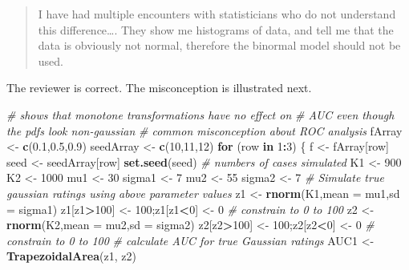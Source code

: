 \documentclass[
]{book}
\newenvironment{Shaded}{\begin{snugshade}}{\end{snugshade}}
\newcommand{\CommentTok}[1]{\textcolor[rgb]{0.56,0.35,0.01}{\textit{#1}}}
\newcommand{\ControlFlowTok}[1]{\textcolor[rgb]{0.13,0.29,0.53}{\textbf{#1}}}
\newcommand{\DataTypeTok}[1]{\textcolor[rgb]{0.13,0.29,0.53}{#1}}
\newcommand{\DecValTok}[1]{\textcolor[rgb]{0.00,0.00,0.81}{#1}}
\newcommand{\FloatTok}[1]{\textcolor[rgb]{0.00,0.00,0.81}{#1}}
\newcommand{\KeywordTok}[1]{\textcolor[rgb]{0.13,0.29,0.53}{\textbf{#1}}}
\newcommand{\NormalTok}[1]{#1}
\newcommand{\OperatorTok}[1]{\textcolor[rgb]{0.81,0.36,0.00}{\textbf{#1}}}
\newcommand{\StringTok}[1]{\textcolor[rgb]{0.31,0.60,0.02}{#1}}
\begin{document}
\begin{quote}
I have had multiple encounters with statisticians who do not understand this difference\ldots. They show me histograms of data, and tell me that the data is obviously not normal, therefore the binormal model should not be used.
\end{quote}

The reviewer is correct. The misconception is illustrated next.

\begin{Shaded}
\begin{Highlighting}[]
\CommentTok{# shows that monotone transformations have no effect on }
\CommentTok{# AUC even though the pdfs look non-gaussian}
\CommentTok{# common misconception about ROC analysis}
\NormalTok{fArray <-}\StringTok{ }\KeywordTok{c}\NormalTok{(}\FloatTok{0.1}\NormalTok{,}\FloatTok{0.5}\NormalTok{,}\FloatTok{0.9}\NormalTok{)}
\NormalTok{seedArray <-}\StringTok{ }\KeywordTok{c}\NormalTok{(}\DecValTok{10}\NormalTok{,}\DecValTok{11}\NormalTok{,}\DecValTok{12}\NormalTok{)}
\ControlFlowTok{for}\NormalTok{ (row }\ControlFlowTok{in} \DecValTok{1}\OperatorTok{:}\DecValTok{3}\NormalTok{) \{ }
\NormalTok{  f <-}\StringTok{ }\NormalTok{fArray[row]}
\NormalTok{  seed <-}\StringTok{ }\NormalTok{seedArray[row]}
  \KeywordTok{set.seed}\NormalTok{(seed) }
  \CommentTok{# numbers of cases simulated}
\NormalTok{  K1 <-}\StringTok{ }\DecValTok{900}
\NormalTok{  K2 <-}\StringTok{ }\DecValTok{1000}
\NormalTok{  mu1 <-}\StringTok{ }\DecValTok{30}
\NormalTok{  sigma1 <-}\StringTok{ }\DecValTok{7}
\NormalTok{  mu2 <-}\StringTok{ }\DecValTok{55}
\NormalTok{  sigma2 <-}\StringTok{ }\DecValTok{7} 
  \CommentTok{# Simulate true gaussian ratings using above parameter values}
\NormalTok{  z1 <-}\StringTok{ }\KeywordTok{rnorm}\NormalTok{(K1,}\DataTypeTok{mean =}\NormalTok{ mu1,}\DataTypeTok{sd =}\NormalTok{ sigma1)}
\NormalTok{  z1[z1}\OperatorTok{>}\DecValTok{100}\NormalTok{] <-}\StringTok{ }\DecValTok{100}\NormalTok{;z1[z1}\OperatorTok{<}\DecValTok{0}\NormalTok{] <-}\StringTok{ }\DecValTok{0} \CommentTok{# constrain to 0 to 100}
\NormalTok{  z2 <-}\StringTok{ }\KeywordTok{rnorm}\NormalTok{(K2,}\DataTypeTok{mean =}\NormalTok{ mu2,}\DataTypeTok{sd =}\NormalTok{ sigma2)}
\NormalTok{  z2[z2}\OperatorTok{>}\DecValTok{100}\NormalTok{] <-}\StringTok{ }\DecValTok{100}\NormalTok{;z2[z2}\OperatorTok{<}\DecValTok{0}\NormalTok{] <-}\StringTok{ }\DecValTok{0} \CommentTok{# constrain to 0 to 100}
  \CommentTok{# calculate AUC for true Gaussian ratings}
\NormalTok{  AUC1 <-}\StringTok{ }\KeywordTok{TrapezoidalArea}\NormalTok{(z1, z2)}

\end{Highlighting}
\end{Shaded}
\end{document}
